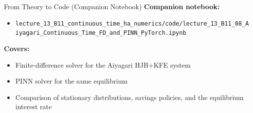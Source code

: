 \documentclass[aspectratio=169,11pt]{beamer}
\begin{document}
\begin{frame}{From Theory to Code (Companion Notebook)}
\footnotesize
\textbf{Companion notebook:}
\begin{itemize}\itemsep2pt
    \item \texttt{lecture\_13\_B11\_continuous\_time\_ha\_numerics/code/\allowbreak lecture\_13\_B11\_08\_Aiyagari\_Continuous\_Time\_FD\_and\_PINN\_PyTorch.ipynb}
\end{itemize}

\vspace{0.3em}
\textbf{Covers:}
\begin{itemize}\itemsep2pt
    \item Finite-difference solver for the Aiyagari HJB+KFE system
    \item PINN solver for the same equilibrium
    \item Comparison of stationary distributions, savings policies, and the equilibrium interest rate
\end{itemize}
\end{frame}
\end{document}
